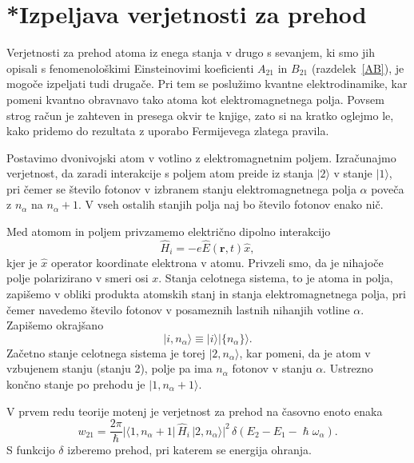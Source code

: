 \section{*Izpeljava verjetnosti za prehod}
\label{chap:verjetnost}
Verjetnosti za prehod atoma iz enega stanja v drugo s sevanjem, ki
smo jih opisali s fenomenološkimi Einsteinovimi koeficienti $A_{21}$
in $B_{21}$ (razdelek~\ref{AB}), 
je mogoče izpeljati tudi drugače.
Pri tem se poslužimo kvantne elektrodinamike, 
kar pomeni kvantno obravnavo 
tako atoma kot elektromagnetnega polja. Povsem strog račun je zahteven in presega
okvir te knjige, zato si na kratko oglejmo le, kako pridemo do rezultata z uporabo
Fermijevega zlatega pravila.

Postavimo dvonivojski atom v votlino z elektromagnetnim poljem.
Izračunajmo verjetnost, da zaradi interakcije s poljem atom
preide iz stanja $|2\rangle$ v stanje $|1\rangle$, pri čemer se
število fotonov v izbranem stanju elektromagnetnega polja $\alpha$
poveča z $n_{\alpha}$ na $n_{\alpha}+1$. V vseh ostalih stanjih
polja naj bo število fotonov enako nič.

Med atomom in poljem privzamemo električno dipolno interakcijo 
\begin{equation}
\hat{H}_{i}=-e\hat{E}(\mathbf{r},t)\hat{x},
\label{4.47}
\end{equation}
kjer je $\hat{x}$ operator koordinate elektrona v atomu. 
Privzeli
smo, da je nihajoče polje polarizirano v smeri osi $x$. Stanja celotnega sistema, 
to je atoma in polja, zapišemo v obliki produkta atomskih stanj in
stanja elektromagnetnega polja, pri čemer navedemo število fotonov
v posameznih lastnih nihanjih votline $\alpha$. Zapišemo okrajšano
\begin{equation}
|i,n_{\alpha}\rangle\equiv|i\rangle|\{n_{\alpha}\}\rangle.
\label{4.48}
\end{equation}
Začetno stanje celotnega sistema je torej $|2,n_{\alpha}\rangle$, kar pomeni, da je
atom v vzbujenem stanju (stanju 2), polje pa ima $n_{\alpha}$ fotonov v stanju $\alpha$.
Ustrezno končno stanje po prehodu je $|1,n_{\alpha}+1\rangle$.

V prvem redu teorije motenj je verjetnost za prehod na časovno enoto enaka
\begin{equation}
w_{21}=\frac{2\pi}{\hslash}|\langle1,n_{\alpha}+
1|\,\hat{H}_{i}\,|2,n_{\alpha}\rangle|^{2}\,
\delta(E_{2}-E_{1}-\hslash\omega_{\alpha}).
\label{4.49}
\end{equation}
S funkcijo $\delta$ izberemo prehod, pri katerem se energija ohranja.

